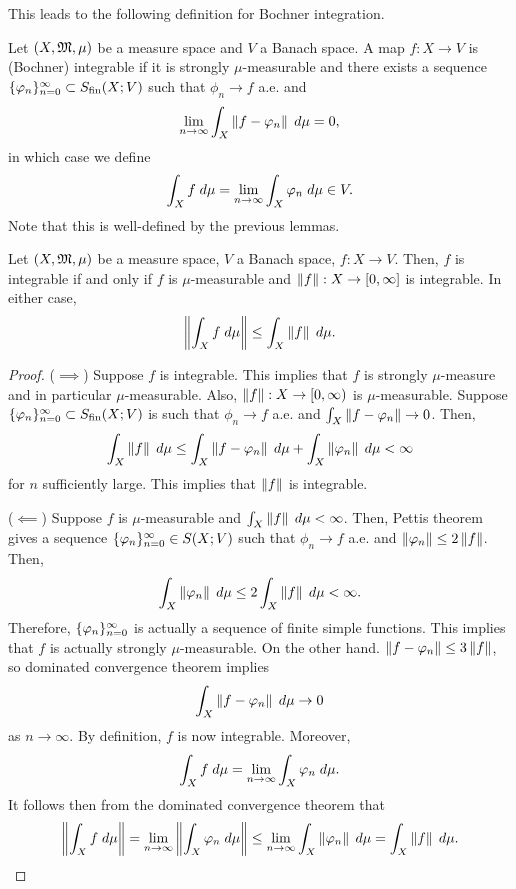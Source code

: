 \documentclass[a4paper]{article}
\begin{document}
This leads to the following definition for Bochner integration.

\begin{defi}
Let $(X, \mathfrak{M}, \mu)$ be a measure space and $V$ a Banach space.
A map $f : X \to V$ is (Bochner) integrable if
it is strongly $\mu$-measurable and there exists a sequence
$\{ \varphi_n \}_{n=0}^\infty \subset S_{\text{fin}}(X; V)$ such that $\phi_n \to f$
a.e. and
\[
\lim_{n \to \infty} \int_X \left\lVert f - \varphi_n\right\rVert \; d \mu = 0,
\]
in which case we define
\[
\int_X f \; d \mu = \lim_{n \to \infty} \int_X \varphi_n \; d \mu \in V.
\]
Note that this is well-defined by the previous lemmas.
\end{defi}

\begin{thm}
Let $(X, \mathfrak{M}, \mu)$ be a measure space, $V$ a Banach space,
$f : X \to V$. Then,
$f$ is integrable if and only if $f$ is $\mu$-measurable
and $\left\lVert f\right\rVert : X \to [0, \infty]$ is integrable.
In either case,
\[
\left\lVert \int_X f \; d \mu\right\rVert \leq \int_X \left\lVert f\right\rVert \; d \mu.
\]
\end{thm}

\begin{proof}
($\implies$) Suppose $f$ is integrable. This implies that
$f$ is strongly $\mu$-measure and in particular $\mu$-measurable.
Also, $\left\lVert f\right\rVert : X \to [0, \infty)$ is $\mu$-measurable.
Suppose $\{ \varphi_n \}_{n=0}^\infty \subset S_{\text{fin}}(X; V)$ is such that
$\phi_n \to f$ a.e. and $\int_X \left\lVert f - \varphi_n\right\rVert \to 0$.
Then,
\[
\begin{aligned}
\int_X \left\lVert f\right\rVert \; d \mu
\leq \int_X \left\lVert f - \varphi_n\right\rVert \; d \mu + \int_X \left\lVert \varphi_n\right\rVert
\; d \mu < \infty
\end{aligned}
\]
for $n$ sufficiently large. This implies that $\left\lVert f\right\rVert$
is integrable.

($\impliedby$) Suppose $f$ is $\mu$-measurable and
$\int_X \left\lVert f\right\rVert \; d \mu < \infty$. Then, Pettis theorem
gives a sequence $\{ \varphi_n \}_{n=0}^\infty \in S(X; V)$ such that
$\phi_n \to f$ a.e. and $\left\lVert \varphi_n\right\rVert \leq 2\left\lVert f\right\rVert$.
Then,
\[
\int_X \left\lVert \varphi_n\right\rVert \; d \mu \leq 2 \int_X \left\lVert f\right\rVert \; d \mu
< \infty.
\]
Therefore, $\{ \varphi_n \}_{n=0}^\infty$ is actually a sequence of
finite simple functions. This implies that
$f$ is actually strongly $\mu$-measurable. On the other hand.
$\left\lVert f - \varphi_n\right\rVert \leq 3\left\lVert f\right\rVert$, so
dominated convergence theorem implies
\[
\int_X \left\lVert f - \varphi_n\right\rVert \; d \mu \to 0
\]
as $n \to \infty$. By definition, $f$ is now integrable.
Moreover,
\[
\int_X f \; d \mu = \lim_{n \to \infty} \int_X \varphi_n \; d \mu.
\]
It follows then from the dominated convergence theorem that
\[
\begin{aligned}
\left\lVert \int_X f \; d \mu\right\rVert
= \lim_{n \to \infty} \left\lVert \int_X \varphi_n \; d \mu\right\rVert
\leq \lim_{n \to \infty} \int_X \left\lVert \varphi_n\right\rVert \; d \mu
= \int_X \left\lVert f\right\rVert \; d \mu.
\end{aligned}
\]
\end{proof}
\end{document}
